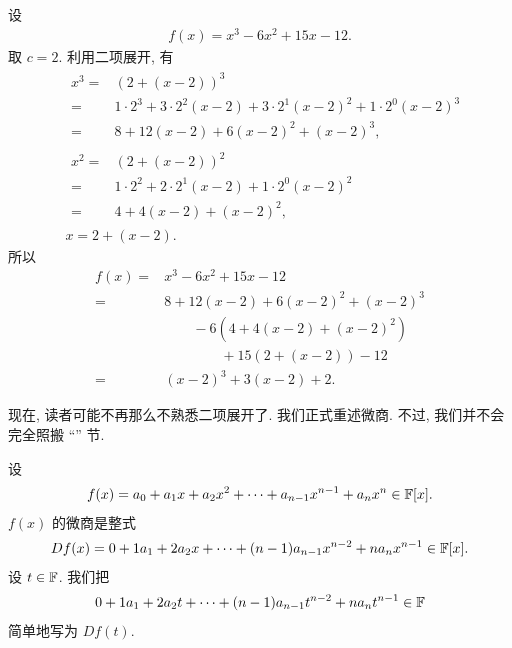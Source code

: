 \begin{example}
    设
    \begin{align*}
        f(x) = x^3 - 6x^2 + 15x - 12.
    \end{align*}
    取 $c = 2$. 利用二项展开, 有
    \begin{align*}
         & \begin{aligned}
            x^3
            = {} & (2 + (x - 2))^3                                                             \\
            = {} & 1 \cdot 2^3 + 3 \cdot 2^2 (x-2) + 3 \cdot 2^1 (x-2)^2 + 1 \cdot 2^0 (x-2)^3 \\
            = {} & 8 + 12(x-2) + 6(x-2)^2 + (x-2)^3,
        \end{aligned} \\
         & \begin{aligned}
            x^2
            = {} & (2 + (x - 2))^2                                       \\
            = {} & 1 \cdot 2^2 + 2 \cdot 2^1 (x-2) + 1 \cdot 2^0 (x-2)^2 \\
            = {} & 4 + 4(x-2) + (x-2)^2,
        \end{aligned} \\
         & x = 2 + (x-2).
    \end{align*}
    所以
    \begin{align*}
        f(x)
        = {} & x^3 - 6x^2 + 15x - 12              \\
        = {} & 8 + 12(x-2) + 6(x-2)^2 + (x-2)^3   \\
             & \qquad - 6(4 + 4(x-2) + (x-2)^2)   \\
             & \qquad \qquad + 15(2 + (x-2)) - 12 \\
        = {} & (x-2)^3 + 3(x-2) + 2.
    \end{align*}
\end{example}

现在, 读者可能不再那么不熟悉二项展开了. 我们正式重述微商. 不过, 我们并不会完全照搬 ``\Derivatives '' 节.

\begin{definition}
    设
    \begin{align*}
        f(x) = a_0 + a_1 x + a_2 x^2 + \cdots + a_{n-1} x^{n-1} + a_n x^n \in \mathbb{F}[x].
    \end{align*}
    $f(x)$ 的微商是整式
    \begin{align*}
        Df(x) = 0 + 1a_1 + 2a_2 x + \cdots + (n-1)a_{n-1} x^{n-2} + na_n x^{n-1} \in \mathbb{F}[x].
    \end{align*}
    设 $t \in \mathbb{F}$. 我们把
    \begin{align*}
        0 + 1a_1 + 2a_2 t + \cdots + (n-1)a_{n-1} t^{n-2} + na_n t^{n-1} \in \mathbb{F}
    \end{align*}
    简单地写为 $Df(t)$.
\end{definition}

